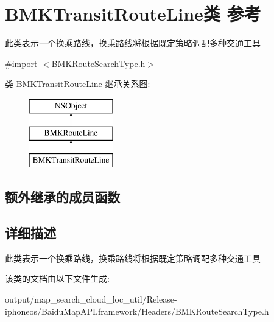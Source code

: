 \hypertarget{interface_b_m_k_transit_route_line}{}\section{B\+M\+K\+Transit\+Route\+Line类 参考}
\label{interface_b_m_k_transit_route_line}


此类表示一个换乘路线，换乘路线将根据既定策略调配多种交通工具  




{\ttfamily \#import $<$B\+M\+K\+Route\+Search\+Type.\+h$>$}

类 B\+M\+K\+Transit\+Route\+Line 继承关系图\+:\begin{figure}[H]
\begin{center}
\leavevmode
\includegraphics[height=3.000000cm]{interface_b_m_k_transit_route_line}
\end{center}
\end{figure}
\subsection*{额外继承的成员函数}


\subsection{详细描述}
此类表示一个换乘路线，换乘路线将根据既定策略调配多种交通工具 

该类的文档由以下文件生成\+:\begin{DoxyCompactItemize}
\item 
output/map\+\_\+search\+\_\+cloud\+\_\+loc\+\_\+util/\+Release-\/iphoneos/\+Baidu\+Map\+A\+P\+I.\+framework/\+Headers/B\+M\+K\+Route\+Search\+Type.\+h\end{DoxyCompactItemize}
